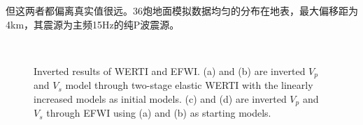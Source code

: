 但这两者都偏离真实值很远。36炮地面模拟数据均匀的分布在地表，最大偏移距为4km，其震源为主频15Hz的纯P波震源。
\begin{figure}[!htb]
   \centering
   \\
   \caption{Inverted results of WERTI and EFWI. (a) and (b) are inverted $V_p$ and
       $V_s$ model through two-stage elastic WERTI with the linearly increased models
       as initial models. (c) and (d) are inverted $V_p$ and $V_s$ through EFWI using
   (a) and (b) as starting models.}
   \label{fig:InvertedModel}
\end{figure}
